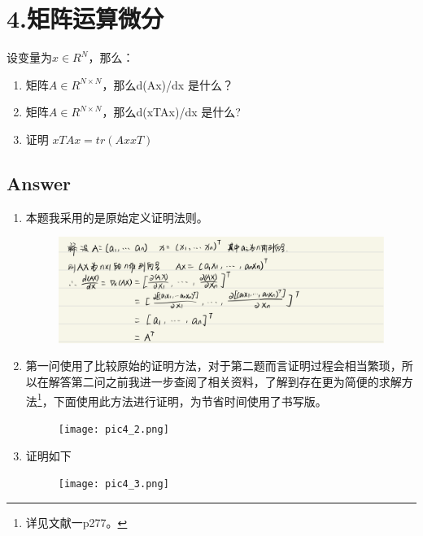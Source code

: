 \documentclass[
	12pt, %
]{fphw} %
\begin{document}
\section*{4.矩阵运算微分}

\begin{problem}
	设变量为$x\in R^N$，那么：
	\begin{enumerate}
		\item 矩阵$A\in R^{N\times N}$，那么d(Ax)/dx 是什么？
		\item 矩阵$A\in R^{N\times N}$，那么d(xTAx)/dx 是什么?
		\item 证明 $xTAx = tr(AxxT)$
	\end{enumerate}
	\medskip
\end{problem}


\subsection*{Answer} 

\begin{enumerate}
	\item 本题我采用的是原始定义证明法则。
	\begin{figure}[h]
		\centering
		\includegraphics[width=1.0\columnwidth]{pic4_1.png} %
	\end{figure}
	\item 第一问使用了比较原始的证明方法，对于第二题而言证明过程会相当繁琐，所以在解答第二问之前我进一步查阅了相关资料\cite{matrix}，了解到存在更为简便的求解方法\footnote{详见文献一p277。}，下面使用此方法进行证明，为节省时间使用了书写版。
	\begin{figure}[H]
		\centering
		\texttt{[image: pic4\_2.png]} %
	\end{figure}
	\item 证明如下
	\begin{figure}[H]
		\centering
		\texttt{[image: pic4\_3.png]} %
	\end{figure}
\end{enumerate}
\end{document}
